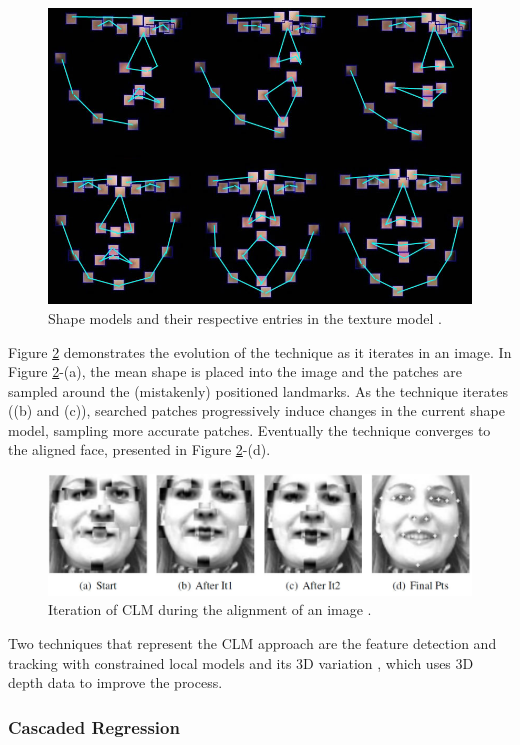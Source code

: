 \begin{figure}[ht]
    \centering
    \includegraphics[width=0.6\linewidth]{figures/clm-patches.jpg}
    \caption{Shape models and their respective entries in the texture model \parencite{yu2010facial}.}
    \label{fig:clm-patches}
\end{figure}

Figure \ref{fig:clm-evolution} demonstrates the evolution of the technique as it iterates in an image. In Figure \ref{fig:clm-evolution}-(a), the mean shape is placed into the image and the patches are sampled around the (mistakenly) positioned landmarks. As the technique iterates ((b) and (c)), searched patches progressively induce changes in the current shape model, sampling more accurate patches. Eventually the technique converges to the aligned face, presented in Figure \ref{fig:clm-evolution}-(d).

\begin{figure}[ht]
    \centering
    \includegraphics[width=0.9\linewidth]{figures/clm-evolution.jpg}
    \caption{Iteration of CLM during the alignment of an image \parencite{cristinacce2006feature}.}
    \label{fig:clm-evolution}
\end{figure}

Two techniques that represent the CLM approach are the feature detection and tracking with constrained local models \parencite{cristinacce2006feature} and its 3D variation \parencite{baltruvsaitis20123d}, which uses 3D depth data to improve the process.

\subsubsection{Cascaded Regression}

